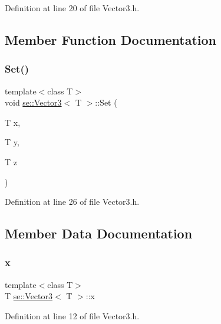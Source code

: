 Definition at line 20 of file Vector3.\+h.



\subsection{Member Function Documentation}
\mbox{\label{classse_1_1_vector3_a413a3535ea9c8a76ef2f4d8c782684b8}} 
\subsubsection{\texorpdfstring{Set()}{Set()}}
{\footnotesize\ttfamily template$<$class T$>$ \\
void \mbox{\hyperlink{classse_1_1_vector3}{se\+::\+Vector3}}$<$ T $>$\+::Set (\begin{DoxyParamCaption}\item[{T}]{x,  }\item[{T}]{y,  }\item[{T}]{z }\end{DoxyParamCaption})\hspace{0.3cm}{\ttfamily [inline]}}



Definition at line 26 of file Vector3.\+h.



\subsection{Member Data Documentation}
\mbox{\label{classse_1_1_vector3_a1dd0e9af86e73921dd391b00dbfd8526}} 
\subsubsection{\texorpdfstring{x}{x}}
{\footnotesize\ttfamily template$<$class T$>$ \\
T \mbox{\hyperlink{classse_1_1_vector3}{se\+::\+Vector3}}$<$ T $>$\+::x}



Definition at line 12 of file Vector3.\+h.

\mbox{\label{classse_1_1_vector3_a32fd129ef6071a9316612fa223e2ca1b}} 
